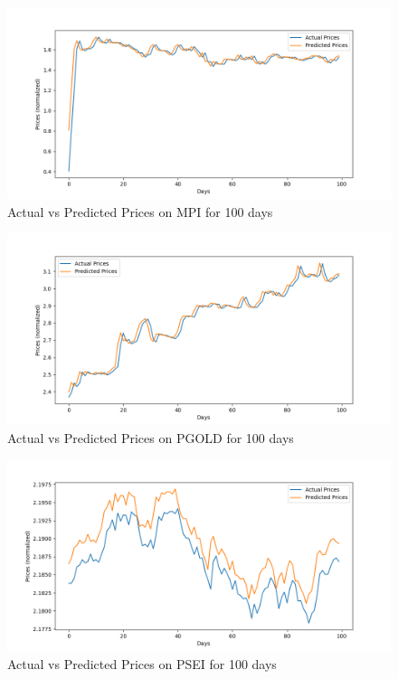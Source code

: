 \begin{figure}[ht]
    \centering
    \includegraphics[width=1\textwidth]{./assets/Chapter_4/DMD_LSTM_crossval/100days/MPI.png}
    \caption{Actual vs Predicted Prices on MPI for 100 days}
    \label{fig:crossval100_MPI}
\end{figure}
\FloatBarrier

\begin{figure}[ht]
    \centering
    \includegraphics[width=1\textwidth]{./assets/Chapter_4/DMD_LSTM_crossval/100days/PGOLD.png}
    \caption{Actual vs Predicted Prices on PGOLD for 100 days}
    \label{fig:crossval100_PGOLD}
\end{figure}
\FloatBarrier

\begin{figure}[ht]
    \centering
    \includegraphics[width=1\textwidth]{./assets/Chapter_4/DMD_LSTM_crossval/100days/PSEI.png}
    \caption{Actual vs Predicted Prices on PSEI for 100 days}
    \label{fig:crossval100_PSEI}
\end{figure}
\FloatBarrier

